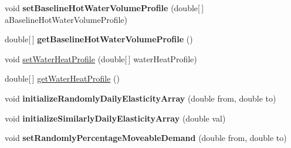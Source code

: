 \begin{DoxyCompactItemize}
\item 
\hypertarget{classuk_1_1ac_1_1dmu_1_1iesd_1_1cascade_1_1agents_1_1prosumers_1_1_household_prosumer_a47c2b265a06eb84f89f87e4d2cfeb78f}{void {\bfseries set\-Baseline\-Hot\-Water\-Volume\-Profile} (double\mbox{[}$\,$\mbox{]} a\-Baseline\-Hot\-Water\-Volume\-Profile)}\label{classuk_1_1ac_1_1dmu_1_1iesd_1_1cascade_1_1agents_1_1prosumers_1_1_household_prosumer_a47c2b265a06eb84f89f87e4d2cfeb78f}

\item 
\hypertarget{classuk_1_1ac_1_1dmu_1_1iesd_1_1cascade_1_1agents_1_1prosumers_1_1_household_prosumer_a4916fc879307b9b6172f21d7b08375e9}{double\mbox{[}$\,$\mbox{]} {\bfseries get\-Baseline\-Hot\-Water\-Volume\-Profile} ()}\label{classuk_1_1ac_1_1dmu_1_1iesd_1_1cascade_1_1agents_1_1prosumers_1_1_household_prosumer_a4916fc879307b9b6172f21d7b08375e9}

\item 
void \hyperlink{classuk_1_1ac_1_1dmu_1_1iesd_1_1cascade_1_1agents_1_1prosumers_1_1_household_prosumer_ad869f2f680508431a3122ec12d0336f6}{set\-Water\-Heat\-Profile} (double\mbox{[}$\,$\mbox{]} water\-Heat\-Profile)
\item 
double\mbox{[}$\,$\mbox{]} \hyperlink{classuk_1_1ac_1_1dmu_1_1iesd_1_1cascade_1_1agents_1_1prosumers_1_1_household_prosumer_a238c821097d2b68966db2ca7bc4910e4}{get\-Water\-Heat\-Profile} ()
\item 
\hypertarget{classuk_1_1ac_1_1dmu_1_1iesd_1_1cascade_1_1agents_1_1prosumers_1_1_household_prosumer_a3ca55be59469c948637d1f2804e171b5}{void {\bfseries initialize\-Randomly\-Daily\-Elasticity\-Array} (double from, double to)}\label{classuk_1_1ac_1_1dmu_1_1iesd_1_1cascade_1_1agents_1_1prosumers_1_1_household_prosumer_a3ca55be59469c948637d1f2804e171b5}

\item 
\hypertarget{classuk_1_1ac_1_1dmu_1_1iesd_1_1cascade_1_1agents_1_1prosumers_1_1_household_prosumer_a113b7b6628024b43840a90d90944ec9c}{void {\bfseries initialize\-Similarly\-Daily\-Elasticity\-Array} (double val)}\label{classuk_1_1ac_1_1dmu_1_1iesd_1_1cascade_1_1agents_1_1prosumers_1_1_household_prosumer_a113b7b6628024b43840a90d90944ec9c}

\item 
\hypertarget{classuk_1_1ac_1_1dmu_1_1iesd_1_1cascade_1_1agents_1_1prosumers_1_1_household_prosumer_a9a2929241cb085e7e0f9fc89d7f70d59}{void {\bfseries set\-Randomly\-Percentage\-Moveable\-Demand} (double from, double to)}\label{classuk_1_1ac_1_1dmu_1_1iesd_1_1cascade_1_1agents_1_1prosumers_1_1_household_prosumer_a9a2929241cb085e7e0f9fc89d7f70d59}


\end{DoxyCompactItemize}
